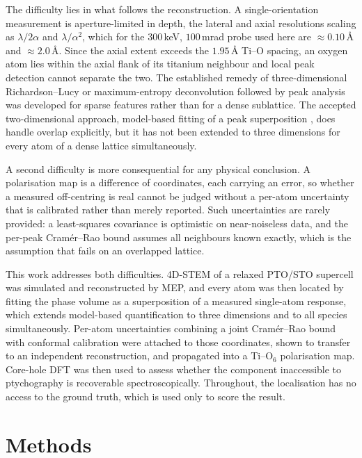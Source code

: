\documentclass[aps,prb,twocolumn,superscriptaddress,floatfix,nofootinbib]{revtex4-2}
\begin{document}
The difficulty lies in what follows the reconstruction. A single-orientation measurement is
aperture-limited in depth, the lateral and axial resolutions scaling as $\lambda/2\alpha$ and
$\lambda/\alpha^2$, which for the $300$\,keV, $100$\,mrad probe used here are
$\approx0.10$\,\AA{} and $\approx2.0$\,\AA. Since the axial extent exceeds the $1.95$\,\AA{}
Ti--O spacing, an oxygen atom lies within the axial flank of its titanium neighbour and local
peak detection cannot separate the two. The established remedy of three-dimensional
Richardson--Lucy or maximum-entropy deconvolution followed by peak analysis \citep{Ishizuka2021}
was developed for sparse features rather than for a dense sublattice. The accepted
two-dimensional approach, model-based fitting of a peak superposition \citep{DeBacker2016},
does handle overlap explicitly, but it has not been extended to three dimensions for every atom
of a dense lattice simultaneously.

A second difficulty is more consequential for any physical conclusion. A polarisation map is a
difference of coordinates, each carrying an error, so whether a measured off-centring is real
cannot be judged without a per-atom uncertainty that is calibrated rather than merely reported.
Such uncertainties are rarely provided: a least-squares covariance is optimistic on
near-noiseless data, and the per-peak Cram\'er--Rao bound assumes all neighbours known exactly,
which is the assumption that fails on an overlapped lattice.

This work addresses both difficulties. 4D-STEM of a relaxed PTO/STO supercell was simulated and
reconstructed by MEP, and every atom was then located by fitting the phase volume as a
superposition of a measured single-atom response, which extends model-based quantification
\citep{DeBacker2016} to three dimensions and to all species simultaneously. Per-atom
uncertainties combining a joint Cram\'er--Rao bound with conformal calibration were attached to
those coordinates, shown to transfer to an independent reconstruction, and propagated into a
Ti--O$_6$ polarisation map. Core-hole DFT was then used to assess whether the component
inaccessible to ptychography is recoverable spectroscopically. Throughout, the localisation has
no access to the ground truth, which is used only to score the result.

\section{Methods}
\end{document}
